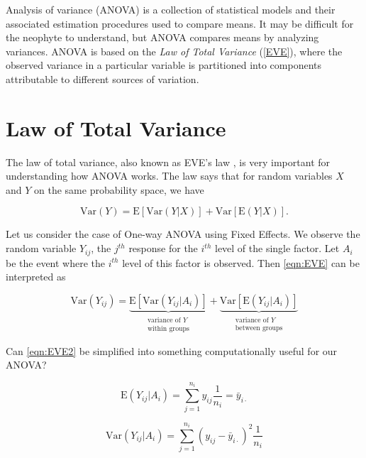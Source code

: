 \documentclass[
]{book}
\newcommand{\E}{\mathrm{E}}
\newcommand{\Var}{\mathrm{Var}}
\begin{document}
Analysis of variance (ANOVA) is a collection of statistical models and their associated estimation procedures used to compare means. It may be difficult for the neophyte to understand, but ANOVA compares means by analyzing variances. ANOVA is based on the \emph{Law of Total Variance} (\ref{EVE}), where the observed variance in a particular variable is partitioned into components attributable to different sources of variation.\autocite{ANOVA}

\hypertarget{law-of-total-variance}{%
\section{\texorpdfstring{Law of Total Variance \label{EVE}}{Law of Total Variance }}\label{law-of-total-variance}}

The law of total variance, also known as EVE's law \autocite{EVE}\autocite{EVE-intuition}, is very important for understanding how ANOVA works. The law says that for random variables \(X\) and \(Y\) on the same probability space, we have

\begin{equation}
\label{eqn:EVE}
\Var(Y) = \E[\Var(Y|X)] + \Var[\E(Y|X)].
\end{equation}

Let us consider the case of One-way ANOVA using Fixed Effects. We observe the random variable \(Y_{ij}\), the \(j^{th}\) response for the \(i^{th}\) level of the single factor. Let \(A_i\) be the event where the \(i^{th}\) level of this factor is observed. Then \ref{eqn:EVE} can be interpreted as

\begin{equation}
\label{eqn:EVE2}
\Var(Y_{ij}) = \underbrace{\E[\Var(Y_{ij}|A_i)]}_{\substack{\text{variance of } Y \\ \text{within groups}}} + \underbrace{\Var[\E(Y_{ij}|A_i)]}_{\substack{\text{variance of } Y \\ \text{between groups}}}
\end{equation}

Can \ref{eqn:EVE2} be simplified into something computationally useful for our ANOVA?

\begin{equation}
\label{eqn:EVE2.1}
\E(Y_{ij}|A_i) = \sum_{j = 1}^{n_i} y_{ij} \frac{1}{n_i} = \bar{y}_{i \cdot}
\end{equation}

\begin{equation}
\label{eqn:EVE2.2}
\Var(Y_{ij}|A_i) = \sum_{j = 1}^{n_i} \left(y_{ij} - \bar{y}_{i \cdot} \right)^2 \frac{1}{n_i}
\end{equation}
\end{document}

